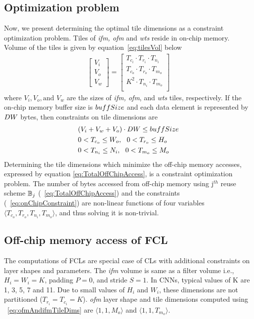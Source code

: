 \subsection{Optimization problem}
Now, we present determining the optimal tile dimensions as a constraint optimization problem. Tiles of \textit{ifm, ofm} and \textit{wts} reside in on-chip memory. Volume of the tiles is given by equation~\eqref{eq:tilesVol} below
\begin{align}\label{eq:tilesVol}
	\begin{bmatrix}
		V_i \\ V_o \\ V_w
	\end{bmatrix}=
	\begin{bmatrix}
		T_{c_i}\cdot T_{r_i}\cdot T_{n_i}\\
		T_{c_o}\cdot T_{r_o}\cdot T_{m_o}\\
		K^2\cdot T_{n_i}\cdot T_{m_o}\\
	\end{bmatrix}
\end{align}
where $V_i, V_o, \text{and }V_w$ are the sizes of \textit{ifm, ofm}, and \textit{wts} tiles, respectively. If the on-chip memory buffer size is $buffSize$ and each data element is represented by $DW$ bytes, then constraints on tile dimensions are
\begin{align}\label{eq:onChipConstraint}
	\begin{split}
		&(V_i + V_w + V_o)\cdot DW\leq buffSize \\
		&0<T_{c_o}\leq W_o,~\ 0<T_{r_o}\leq H_o\\
		&0<T_{n_i}\leq N_i,~\ 0<T_{m_o}\leq M_o
	\end{split}
\end{align}
Determining the tile dimensions which minimize the off-chip memory accesses, expressed by equation \eqref{eq:TotalOffChipAccess}, is a constraint optimization problem. The  number of bytes accessed from off-chip memory using j$^{th}$ reuse scheme $\mathbb{B}_j$ (~\eqref{eq:TotalOffChipAccess}) and the constraints (~\eqref{eq:onChipConstraint}) are non-linear functions of four variables $\langle T_{c_o},T_{r_o},T_{n_i},T_{m_o}\rangle$, and thus solving it is non-trivial.
\subsection{Off-chip memory access of FCL}\label{sec:AccessFCLData}
The computations of FCLs are special case of CLs with  additional constraints on layer shapes and parameters. The \textit{ifm} volume is same as a filter volume i.e., $H_i{=}W_i{=}K$, padding $P{=}0$, and stride $S{=}1$. In CNNs, typical values of K are 1, 3, 5, 7 and 11. Due to small values of $H_i$ and $W_i$, these dimensions are not partitioned ($T_{r_i}{=}T_{c_i}{=}K$). \textit{ofm} layer shape and tile dimensions computed using ~\eqref{eq:ofmAndifmTileDims} are $\langle 1,1,M_o\rangle$ and $\langle 1,1,T_{m_o}\rangle$.

